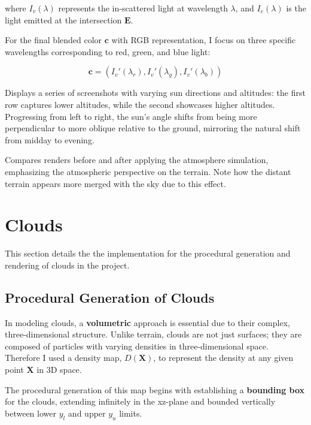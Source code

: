 where $I_v(\lambda)$ represents the in-scattered light at wavelength $\lambda$, and $I_e(\lambda)$ is the light emitted at the intersection $\mathbf{E}$. 

For the final blended color $\mathbf{c}$ with RGB representation, I focus on three specific wavelengths corresponding to red, green, and blue light:

\begin{equation}
\mathbf{c} = (I_{v}'(\lambda_r), I_{v}'(\lambda_g), I_{v}'(\lambda_b))
\end{equation}

{Displays a series of screenshots with varying sun directions and altitudes: the first row captures lower altitudes, while the second showcases higher altitudes. Progressing from left to right, the sun's angle shifts from being more perpendicular to more oblique relative to the ground, mirroring the natural shift from midday to evening.}

{Compares renders before and after applying the atmosphere simulation, emphasizing the atmospheric perspective on the terrain. Note how the distant terrain appears more merged with the sky due to this effect.}

\section{Clouds}

This section details the the implementation for the procedural generation and rendering of clouds in the project.

\subsection{Procedural Generation of Clouds}

In modeling clouds, a \textbf{volumetric} approach is essential due to their complex, three-dimensional structure. Unlike terrain, clouds are not just surfaces; they are composed of particles with varying densities in three-dimensional space. Therefore I used a density map, $D(\mathbf{X})$, to represent the density at any given point $\mathbf{X}$ in 3D space.

The procedural generation of this map begins with establishing a \textbf{bounding box} for the clouds, extending infinitely in the xz-plane and bounded vertically between lower $y_l$ and upper $y_u$ limits.

